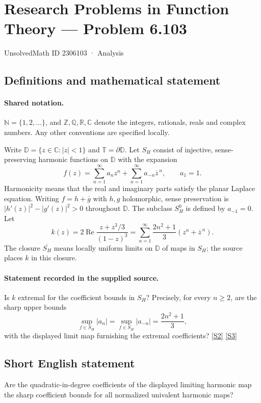 \documentclass[11pt]{article}
\newcommand{\sref}[2]{\hyperlink{source:#1:#2}{[S#2]}}
\begin{document}
\setcounter{section}{2306102}
\section{Research Problems in Function Theory — Problem 6.103}\label{2306103}
{\small\sffamily UnsolvedMath ID 2306103 · Analysis}
\subsection{Definitions and mathematical statement}

\paragraph{Shared notation.}$\mathbb N=\{1,2,\ldots\}$, and $\mathbb Z,\mathbb Q,\mathbb R,\mathbb C$ denote the integers, rationals, reals and complex numbers. Any other conventions are specified locally.


Write $\mathbb D=\{z\in\mathbb C:|z|<1\}$ and $\mathbb T=\partial\mathbb D$. Let $S_H$ consist of injective, sense-preserving harmonic functions on $\mathbb D$ with the expansion
\[f(z)=\sum_{n=1}^{\infty}a_nz^n+\sum_{n=1}^{\infty}a_{-n}\overline z^{\,n},\qquad a_1=1.\]
Harmonicity means that the real and imaginary parts satisfy the planar Laplace equation. Writing $f=h+\overline g$ with $h,g$ holomorphic, sense preservation is $|h'(z)|^2-|g'(z)|^2>0$ throughout $\mathbb D$. The subclass $S_H^0$ is defined by $a_{-1}=0$.
Let
\[k(z)=2\operatorname{Re}\frac{z+z^3/3}{(1-z)^3}
=\sum_{n=1}^{\infty}\frac{2n^2+1}{3}(z^n+\overline z^{\,n}).\]
The closure $\overline{S_H}$ means locally uniform limits on $\mathbb D$ of maps in $S_H$; the source places $k$ in this closure.
\paragraph{Statement recorded in the supplied source.}
Is $k$ extremal for the coefficient bounds in $S_H$? Precisely, for every $n\geq2$, are the sharp upper bounds
\[\sup_{f\in S_H}|a_n|=\sup_{f\in S_H}|a_{-n}|=\frac{2n^2+1}{3},\]
with the displayed limit map furnishing the extremal coefficients? \sref{2306103}{2} \sref{2306103}{3}
\subsection{Short English statement}
Are the quadratic-in-degree coefficients of the displayed limiting harmonic map the sharp coefficient bounds for all normalized univalent harmonic maps?
\end{document}
